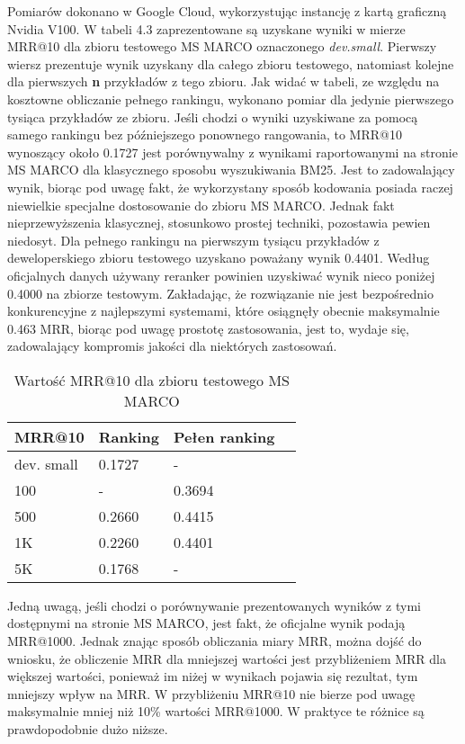 Pomiarów dokonano w Google Cloud, wykorzystując instancję z kartą graficzną Nvidia V100. W tabeli 4.3 zaprezentowane są uzyskane wyniki w mierze MRR@10 dla zbioru testowego MS MARCO oznaczonego \emph{dev.small}. Pierwszy wiersz prezentuje wynik uzyskany dla całego zbioru testowego, natomiast kolejne dla pierwszych \textbf{n} przykładów z tego zbioru. Jak widać w tabeli, ze względu na kosztowne obliczanie pełnego rankingu, wykonano pomiar dla jedynie pierwszego tysiąca przykładów ze zbioru. Jeśli chodzi o wyniki uzyskiwane za pomocą samego rankingu bez późniejszego ponownego rangowania, to MRR@10 wynoszący około 0.1727 jest porównywalny z wynikami raportowanymi na stronie MS MARCO dla klasycznego sposobu wyszukiwania BM25. Jest to zadowalający wynik, biorąc pod uwagę fakt, że wykorzystany sposób kodowania posiada raczej niewielkie specjalne dostosowanie do zbioru MS MARCO. Jednak fakt nieprzewyższenia klasycznej, stosunkowo prostej techniki, pozostawia pewien niedosyt. Dla pełnego rankingu na pierwszym tysiącu przykładów z deweloperskiego zbioru testowego uzyskano poważany wynik 0.4401. Według oficjalnych danych używany reranker powinien uzyskiwać wynik nieco poniżej 0.4000 na zbiorze testowym. Zakładając, że rozwiązanie nie jest bezpośrednio konkurencyjne z najlepszymi systemami, które osiągnęły obecnie maksymalnie 0.463 MRR, biorąc pod uwagę prostotę zastosowania, jest to, wydaje się, zadowalający kompromis jakości dla niektórych zastosowań. \newline


\begin{table}[htp]
\centering
\caption{Wartość MRR@10 dla zbioru testowego MS MARCO}
\vspace*{5mm}
\begin{tabular}{llll}
\hline
 MRR@10 & Ranking & Pełen ranking & \\
 \hline
 dev. small & 0.1727 & - & \\
 100 & - & 0.3694 & \\
 500 & 0.2660 & 0.4415 \\
 1K & 0.2260 & 0.4401 \\
 5K & 0.1768 &  - \\
 \hline
\end{tabular}
\end{table}

Jedną uwagą, jeśli chodzi o porównywanie prezentowanych wyników z tymi dostępnymi na stronie MS MARCO, jest fakt, że oficjalne wynik podają MRR@1000. Jednak znając sposób obliczania miary MRR, można dojść do wniosku, że obliczenie MRR dla mniejszej wartości jest przybliżeniem MRR dla większej wartości, ponieważ im niżej w wynikach pojawia się rezultat, tym mniejszy wpływ na MRR. W przybliżeniu MRR@10 nie bierze pod uwagę maksymalnie mniej niż 10\% wartości MRR@1000. W praktyce te różnice są prawdopodobnie dużo niższe.\newline

